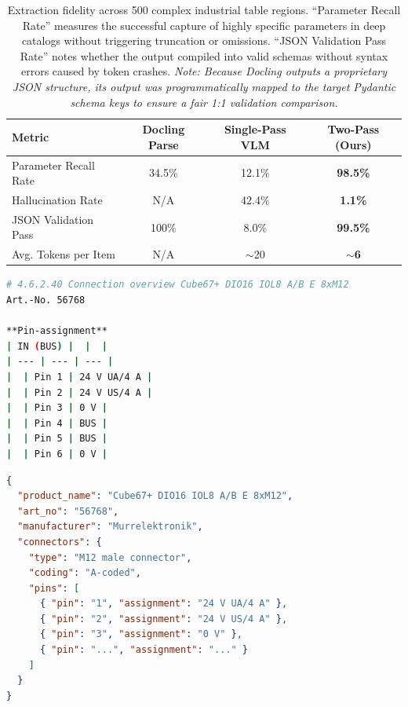 \begin{table}[htbp]
\centering
\begin{tabularx}{\textwidth}{Xccc}
\hline
\textbf{Metric} & \textbf{Docling Parse} & \textbf{Single-Pass VLM} & \textbf{Two-Pass (Ours)} \\
\hline
Parameter Recall Rate & 34.5\% & 12.1\% & \textbf{98.5\%} \\
Hallucination Rate & N/A & 42.4\% & \textbf{1.1\%} \\
JSON Validation Pass & 100\% & 8.0\% & \textbf{99.5\%} \\
Avg. Tokens per Item & N/A & $\sim$20 & \textbf{$\sim$6} \\
\hline
\end{tabularx}
\caption{Extraction fidelity across 500 complex industrial table regions. ``Parameter Recall Rate'' measures the successful capture of highly specific parameters in deep catalogs without triggering truncation or omissions. ``JSON Validation Pass Rate'' notes whether the output compiled into valid schemas without syntax errors caused by token crashes. \textit{Note: Because Docling outputs a proprietary JSON structure, its output was programmatically mapped to the target Pydantic schema keys to ensure a fair 1:1 validation comparison.}}
\label{tab:extraction_fidelity}
\end{table}

\begin{lstlisting}[language=bash, caption={Phase 1: High-fidelity Markdown extraction preserving structural grid markers (Super\_Complex\_2).}, label={lst:raw_markdown}]
# 4.6.2.40 Connection overview Cube67+ DIO16 IOL8 A/B E 8xM12 
Art.-No. 56768

**Pin-assignment**
| IN (BUS) |  |  |
| --- | --- | --- |
|  | Pin 1 | 24 V UA/4 A |
|  | Pin 2 | 24 V US/4 A |
|  | Pin 3 | 0 V |
|  | Pin 4 | BUS |
|  | Pin 5 | BUS |
|  | Pin 6 | 0 V |
\end{lstlisting}

\begin{lstlisting}[language=json, caption={Phase 2: Final JSON extraction with precise unit mapping and nested structural integrity.}, label={lst:structured_json}]
{
  "product_name": "Cube67+ DIO16 IOL8 A/B E 8xM12",
  "art_no": "56768",
  "manufacturer": "Murrelektronik",
  "connectors": {
    "type": "M12 male connector",
    "coding": "A-coded",
    "pins": [
      { "pin": "1", "assignment": "24 V UA/4 A" },
      { "pin": "2", "assignment": "24 V US/4 A" },
      { "pin": "3", "assignment": "0 V" },
      { "pin": "...", "assignment": "..." }
    ]
  }
}
\end{lstlisting}

